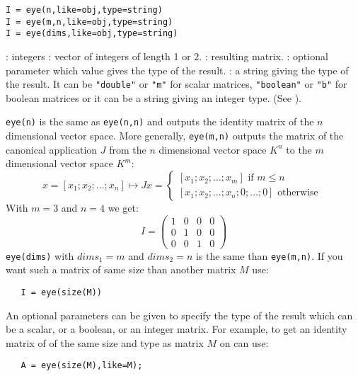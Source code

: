 \begin{mandesc}
\end{mandesc}
\begin{calling_sequence}
\begin{verbatim}
I = eye(n,like=obj,type=string)
I = eye(m,n,like=obj,type=string)
I = eye(dims,like=obj,type=string)
\end{verbatim}
\end{calling_sequence}
\begin{parameters}
  \begin{varlist}
    : integers
    : vector of integers of length 1 or 2.
    : resulting matrix.
    : optional parameter which value gives the type of the result.
    : a string giving the type of the result. It can be \verb+"double"+ or \verb+"m"+ for 
    scalar matrices, \verb+"boolean"+ or \verb+"b"+ for boolean matrices or it can be a string giving 
    an integer type. (See ).
  \end{varlist}
\end{parameters}

\begin{mandescription}
\verb+eye(n)+ is the same as \verb+eye(n,n)+ and outputs the identity matrix of the $n$ dimensional
vector space. More generally, \verb+eye(m,n)+ outputs the matrix of the canonical application $J$ from
the $n$ dimensional vector space $K^n$ to the $m$ dimensional vector space $K^m$: 
$$
x = \left[ x_1 ; x_2 ; \dots ; x_n \right]  \longmapsto  J x = 
\left\{ 
\begin{array}{l} 
     \left[ x_1 ; x_2 ; \dots ; x_m \right] \mbox{ if } m \le n \\ \left[ x_1 ; x_2 ; \dots ; x_n ; 0 ; \dots ; 0 \right] \mbox{ otherwise }
\end{array} 
\right.
$$
With $m=3$ and $n=4$ we get:
$$
    I = \left( \begin{array}{cccc} 1 & 0 & 0 & 0 \\ 0 & 1 & 0 & 0 \\ 0 & 0 & 1 & 0
      \end{array} \right)
$$
\verb+eye(dims)+ with $dims_1 = m$ and $dims_2 = n$ is the same than  \verb+eye(m,n)+. If you want
such a matrix of same size than another matrix $M$ use: 
\begin{verbatim}
   I = eye(size(M))
\end{verbatim}

An optional parameters can be given to specify the type of the result which can 
be a scalar, or a boolean, or an integer matrix. For example, to get an identity matrix of 
of the same size and type as matrix $M$ on can use:
\begin{verbatim}
   A = eye(size(M),like=M);
\end{verbatim}
\end{mandescription}

